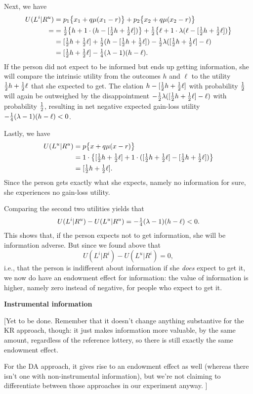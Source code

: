 Next, we have
\begin{align*}
  U(L^i|R^u)
&= p_1\bigl\{x_1 + q\mu(x_1 - r)\bigr\}
 + p_2\bigl\{x_2 + q\mu(x_2 - r)\bigr\}\\=
&= \tfrac{1}{2}\bigl\{h + 1\cdot(h - [\tfrac{1}{2} h + \tfrac{1}{2}\ell])\bigr\}
 + \tfrac{1}{2}\bigl\{\ell + 1\cdot\lambda(\ell - [\tfrac{1}{2} h + \tfrac{1}{2}\ell])\bigr\}\\
&= [\tfrac{1}{2} h + \tfrac{1}{2} \ell] +
\tfrac{1}{2}(h-[\tfrac{1}{2} h + \tfrac{1}{2} \ell]) - \tfrac{1}{2} \lambda([\tfrac{1}{2} h + \tfrac{1}{2}\ell] - \ell)\\
&= [\tfrac{1}{2} h + \tfrac{1}{2} \ell] - \tfrac{1}{4}(\lambda-1)(h - \ell).
\end{align*}
If the person did not expect to be informed but ends up getting information,
she will compare the intrinsic utility from the outcomes $h$ and $\ell$ to the
utility $\tfrac{1}{2} h + \tfrac{1}{2} \ell$ that she expected to get. The elation $h -
[\tfrac{1}{2} h + \tfrac{1}{2} \ell]$ with probability $\tfrac{1}{2}$ will again be outweighed by
the disappointment $ - \tfrac{1}{2} \lambda([\tfrac{1}{2} h + \tfrac{1}{2}\ell] - \ell)$ with
probability $\tfrac{1}{2}$, resulting in net negative expected gain-loss utility
$-\tfrac{1}{4}(\lambda - 1)(h - \ell) < 0$.

Lastly, we have
\begin{align*}
  U(L^u|R^u)
&= p\bigl\{x + q\mu(x - r)\bigr\}
\\
&= 1\cdot\bigl\{[\tfrac{1}{2} h + \tfrac{1}{2} \ell] + 1\cdot([\tfrac{1}{2} h + \tfrac{1}{2} \ell] - [\tfrac{1}{2}
h + \tfrac{1}{2} \ell])\bigr\}\\
&= [\tfrac{1}{2} h + \tfrac{1}{2} \ell].
\end{align*}
Since the person gets exactly what she expects, namely no information for
sure, she experiences no gain-loss utility.

Comparing the second two utilities yields that
\begin{equation*}
  U(L^i|R^u) - U(L^u|R^u) = -\tfrac{1}{4}(\lambda-1)(h-\ell) < 0.
\end{equation*}
This shows that, if the person expects not to get information, she will be
information adverse. But since we found above that
\begin{equation*}
  U(L^i|R^i) - U(L^u|R^i) = 0,
\end{equation*}
i.e., that the person is indifferent about information if she {\em does} expect
to get it, we now do have an endowment effect for information: the value of
information is higher, namely zero instead of negative, for people who expect
to get it.

\brk

\begin{center}
\textbf{Instrumental information}
\end{center}

{\color{red}
[Yet to be done. Remember that it doesn't change anything substantive
for the KR approach, though: it just makes information more valuable, by the
same amount, regardless of the reference lottery, so there is still exactly the
same endowment effect.

For the DA approach, it gives rise to an endowment effect as well (whereas
there isn't one with non-instrumental information), but we're not
claiming to differentiate between those approaches in our experiment anyway.
]
}
